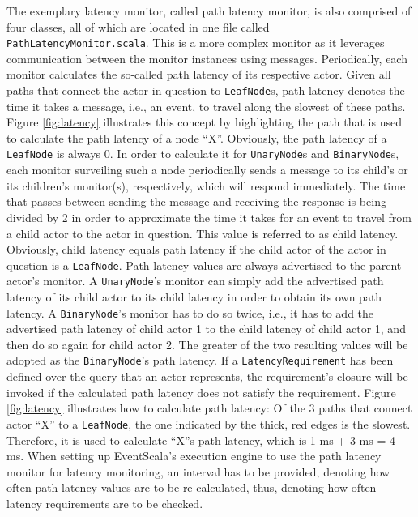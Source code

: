 \documentclass[article, 10pt, type=bsc, colorback, accentcolor=tud8b, parskip=half, bibliography=totocnumbered]{tudthesis}
\begin{document}
The exemplary latency monitor, called path latency monitor, is also comprised of four classes, all of which are located in one file called \lstinline{PathLatencyMonitor.scala}.
This is a more complex monitor as it leverages communication between the monitor instances using messages.
Periodically, each monitor calculates the so-called path latency of its respective actor.
Given all paths that connect the actor in question to \lstinline{LeafNode}s, path latency denotes the time it takes a message, i.e., an event, to travel along the slowest of these paths.
Figure \ref{fig:latency} illustrates this concept by highlighting the path that is used to calculate the path latency of a node ``X''.
Obviously, the path latency of a \lstinline{LeafNode} is always 0.
In order to calculate it for \lstinline{UnaryNode}s and \lstinline{BinaryNode}s, each monitor surveiling such a node periodically sends a message to its child's or its children's monitor(s), respectively, which will respond immediately.
The time that passes between sending the message and receiving the response is being divided by 2 in order to approximate the time it takes for an event to travel from a child actor to the actor in question.
This value is referred to as child latency.
Obviously, child latency equals path latency if the child actor of the actor in question is a \lstinline{LeafNode}.
Path latency values are always advertised to the parent actor's monitor.
A \lstinline{UnaryNode}'s monitor can simply add the advertised path latency of its child actor to its child latency in order to obtain its own path latency.
A \lstinline{BinaryNode}'s monitor has to do so twice, i.e., it has to add the advertised path latency of child actor 1 to the child latency of child actor 1, and then do so again for child actor 2.
The greater of the two resulting values will be adopted as the \lstinline{BinaryNode}'s path latency.
If a \lstinline{LatencyRequirement} has been defined over the query that an actor represents, the requirement's closure will be invoked if the calculated path latency does not satisfy the requirement.
Figure \ref{fig:latency} illustrates how to calculate path latency:
Of the 3 paths that connect actor ``X'' to a \lstinline{LeafNode}, the one indicated by the thick, red edges is the slowest.
Therefore, it is used to calculate ``X''s path latency, which is 1 ms + 3 ms = 4 ms. When setting up EventScala's execution engine to use the path latency monitor for latency monitoring, an interval has to be provided, denoting how often path latency values are to be re-calculated, thus, denoting how often latency requirements are to be checked.
\end{document}
